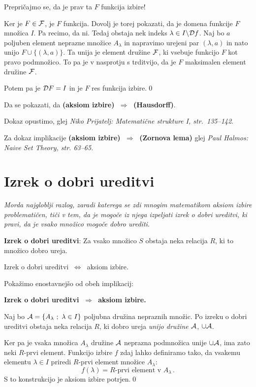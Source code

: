 \documentclass[11pt,paper=b5,footinclude,headinclude]{scrbook} %
\def\sledi {{~\Rightarrow~}}
\def\cee {{~\Leftrightarrow~}}
\begin{document}
Prepričajmo se, da je prav ta $F$ funkcija izbire!

Ker je $F\in{\cal F}$, je $F$ funkcija. Dovolj je torej pokazati, da je domena funkcije $F$ množica $I$. Pa recimo, da ni. Tedaj obstaja nek indeks $\lambda\in I\backslash {\cal D}f$. Naj bo $a$ poljuben element neprazne množice $A_\lambda$ in napravimo urejeni par $(\lambda, a)$ in nato unijo $F\cup\{(\lambda,a)\}$. Ta unija je element družine ${\cal F}$, ki vsebuje funkcijo $F$ kot pravo podmnožico. To pa je v nasprotju s trditvijo, da je $F$ maksimalen element družine ${\cal F}$.

Potem pa je ${\cal D}F = I$ in je $F$ res funkcija izbire.\qed

\bigskip

Da se pokazati, da \textbf{(aksiom izbire) $\sledi$ (Hausdorff)}.

Dokaz opustimo, glej \emph{ Niko Prijatelj: Matemati\v cne strukture I, str.~135--142}.

Za dokaz implikacije \textbf{(aksiom izbire) $\sledi$ (Zornova lema)}
glej \emph{ Paul Halmos: Naive Set Theory, str. 63--65}.

\section{Izrek o dobri ureditvi}

\emph{ Morda najgloblji razlog, zaradi katerega se zdi mnogim matematikom aksiom izbire problematičen,
tiči v tem, da je mogoče iz njega izpeljati izrek o dobri ureditvi, ki pravi, da je vsako
množico mogoče dobro urediti.}


\medskip
\textbf{Izrek o dobri ureditvi}: Za vsako množico $S$ obstaja neka relacija $R$, ki to množico dobro ureja.

\bigskip
Izrek o dobri ureditvi $\cee$ aksiom izbire.

\bigskip
Pokažimo enostavnejšo  od obeh implikacij:

\textbf{Izrek o dobri ureditvi $\sledi$ aksiom izbire.}

Naj bo ${\cal A} = \{A_\lambda~;~\lambda\in I\}$ poljubna družina nepraznih množic.
Po izreku o dobri ureditvi obstaja neka relacija $R$, ki dobro ureja \emph{ unijo družine ${\cal A}$}, $\cup {\cal A}$.

Ker pa je vsaka množica $A_\lambda$ družine ${\cal A}$ neprazna podmnožica
unije $\cup{\cal A}$, ima zato neki $R$-prvi element.
Funkcijo izbire $f$ zdaj lahko definiramo tako, da vsakemu elementu $\lambda\in I$ priredi
$R$-prvi element množice $A_\lambda$:
$$f(\lambda) = R\textrm{-prvi element v }A_\lambda\,.$$
S to konstrukcijo je aksiom izbire potrjen.\qed
\end{document}
